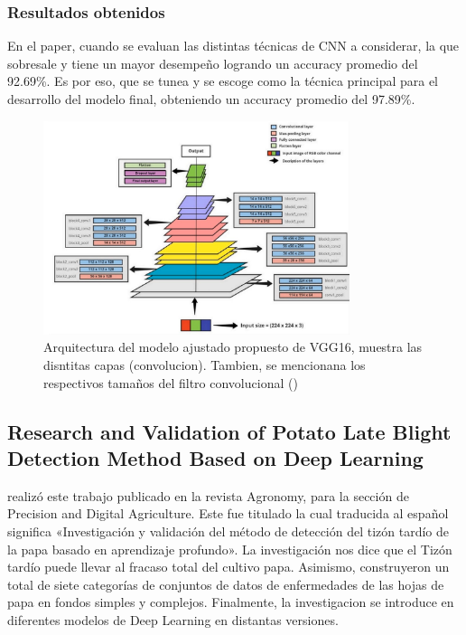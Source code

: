 \subsubsection{Resultados obtenidos}
En el paper, cuando se evaluan las distintas técnicas de CNN a considerar, la que sobresale y tiene un mayor desempeño logrando un accuracy promedio del 92.69\%. Es por eso, que se tunea y se escoge como la técnica principal para el desarrollo del modelo final, obteniendo un accuracy promedio del 97.89\%. 
\begin{figure}[H]
	\begin{center}
		\includegraphics[width=0.8\textwidth]{2/figures/ant1.2.jpeg}
		\caption{Arquitectura del modelo ajustado propuesto de VGG16, muestra las disntitas capas (convolucion). Tambien, se mencionana los respectivos tamaños del filtro convolucional  (\cite{CHAKRABORTY2022101781})}
	\end{center}
\end{figure}

\subsection{Research and Validation of Potato Late Blight Detection Method Based on Deep Learning \citep*{antecedente2}}

\citeauthor{antecedente2} realizó este trabajo publicado en la revista Agronomy, para la sección de Precision and Digital Agriculture.
Este fue titulado  la cual traducida al español significa «Investigación y validación del método de detección del tizón tardío de la papa basado en aprendizaje profundo». La investigación nos dice que el Tizón tardío puede llevar al fracaso total del cultivo papa. Asimismo, construyeron un total de siete categorías de conjuntos de datos de enfermedades de las hojas de papa en fondos simples y complejos. Finalmente, la investigacion se introduce en diferentes modelos de Deep Learning en distantas versiones.


